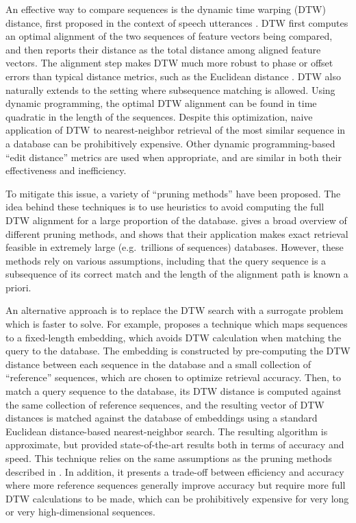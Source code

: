 \documentclass{article}
\begin{document}
An effective way to compare sequences is the dynamic time warping (DTW) distance, first proposed in the context of speech utterances \cite{sakoe1978dynamic}.
DTW first computes an optimal alignment of the two sequences of feature vectors being compared, and then reports their distance as the total distance among aligned feature vectors.
The alignment step makes DTW much more robust to phase or offset errors than typical distance metrics, such as the Euclidean distance \cite{rakthanmanon2012searching}.
DTW also naturally extends to the setting where subsequence matching is allowed.
Using dynamic programming, the optimal DTW alignment can be found in time quadratic in the length of the sequences.
Despite this optimization, naive application of DTW to nearest-neighbor retrieval of the most similar sequence in a database can be prohibitively expensive.
Other dynamic programming-based ``edit distance'' metrics are used when appropriate, and are similar in both their effectiveness and inefficiency.

To mitigate this issue, a variety of ``pruning methods'' have been proposed.
The idea behind these techniques is to use heuristics to avoid computing the full DTW alignment for a large proportion of the database.
\cite{rakthanmanon2012searching} gives a broad overview of different pruning methods, and shows that their application makes exact retrieval feasible in extremely large (e.g.\ trillions of sequences) databases.
However, these methods rely on various assumptions, including that the query sequence is a subsequence of its correct match and the length of the alignment path is known a priori.

An alternative approach is to replace the DTW search with a surrogate problem which is faster to solve.
For example, \cite{papapetrou2011embedding} proposes a technique which maps sequences to a fixed-length embedding, which avoids DTW calculation when matching the query to the database.
The embedding is constructed by pre-computing the DTW distance between each sequence in the database and a small collection of ``reference'' sequences, which are chosen to optimize retrieval accuracy.
Then, to match a query sequence to the database, its DTW distance is computed against the same collection of reference sequences, and the resulting vector of DTW distances is matched against the database of embeddings using a standard Euclidean distance-based nearest-neighbor search.
The resulting algorithm is approximate, but provided state-of-the-art results both in terms of accuracy and speed.
This technique relies on the same assumptions as the pruning methods described in \cite{rakthanmanon2012searching}.
In addition, it presents a trade-off between efficiency and accuracy where more reference sequences generally improve accuracy but require more full DTW calculations to be made, which can be prohibitively expensive for very long or very high-dimensional sequences.
\end{document}
